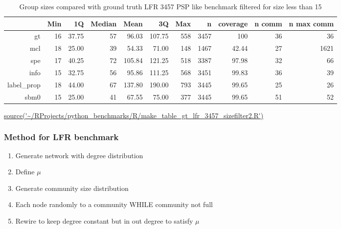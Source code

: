 \begin{table}[ht]
\centering
\begin{adjustbox}{width=\textwidth}

\setlength{\extrarowheight}{2pt}
\begin{tabular}{rrrrrrrrrrr}
  \toprule
  & Min & 1Q & Median & Mean & 3Q & Max & n & coverage & n comm &  n max comm \\ 
  \midrule
  gt & 16 & 37.75 & 57 & 96.03 & 107.75 & 558 & 3457 & 100 & 36 & 36 \\ 
mcl & 18 & 25.00 & 39 & 54.33 & 71.00 & 148 & 1467 & 42.44 & 27 & 1621 \\ 
  spe & 17 & 40.25 & 72 & 105.84 & 121.25 & 518 & 3387 & 97.98 & 32 & 66 \\ 
  info & 15 & 32.75 & 56 & 95.86 & 111.25 & 568 & 3451 & 99.83 & 36 & 39 \\ 
  label\_prop & 18 & 44.00 & 67 & 137.80 & 190.00 & 793 & 3445 & 99.65 & 25 & 26 \\ 
  sbm0 & 15 & 25.00 & 41 & 67.55 & 75.00 & 377 & 3445 & 99.65 & 51 & 52 \\ 
   \bottomrule
\end{tabular}
\end{adjustbox}
\caption{Group sizes compared with ground truth LFR 3457 PSP like benchmark filtered for size less than 15} 
\tiny\url{source('~/RProjects/python_benchmarks/R/make_table_gt_lfr_3457_sizefilter2.R')}
\label{tab:Group sizes compared with ground truth LFR 3457 PSP like benchmark filtered for size less than 15 filter}
\end{table}




\subsubsection{Method for LFR benchmark}

\begin{enumerate}
    \item Generate network with degree distribution
    \item Define $\mu$
    \item Generate community size distribution
    \item Each node randomly to a community WHILE community not full
    \item Rewire to keep degree constant but in out degree to satisfy $\mu$
\end{enumerate}
